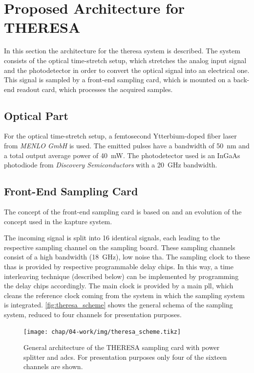 \section{Proposed Architecture for THERESA}
In this section the architecture for the \gls{theresa} system is described.
The system consists of the optical time-stretch setup, which stretches the analog input signal and the photodetector in order to convert the optical signal into an electrical one.
This signal is sampled by a front-end sampling card, which is mounted on a back-end readout card, which processes the acquired samples.

\subsection*{Optical Part}
For the optical time-stretch setup, a femtosecond Ytterbium-doped fiber laser from \textit{MENLO GmbH} is used. The emitted pulses have a bandwidth of \SI{50}{\nano \meter} and a total output average power of \SI{40}{\milli \watt}.
The photodetector used is an InGaAs photodiode from \textit{Discovery Semiconductors} with a \SI{20}{\GHz} bandwidth.

\subsection{Front-End Sampling Card}
The concept of the front-end sampling card is based on and an evolution of the concept used in the \gls{kapture} system. 

The incoming signal is split into 16 identical signals, each leading to the respective sampling channel on the sampling board.
These sampling channels consist of a high bandwidth (\SI{18}{\GHz}), low noise \gls{tha}.
The sampling clock to these \glspl{tha} is provided by respective programmable delay chips.
In this way, a time interleaving technique (described below) can be implemented by programming the delay chips accordingly. 
The main clock is provided by a main \gls{pll}, which cleans the reference clock coming from the system in which the sampling system is integrated.
\autoref{fig:theresa_scheme} shows the general schema of the sampling system, reduced to four channels for presentation purposes.
\begin{figure}[H]
	\centering
	\texttt{[image: chap/04-work/img/theresa\_scheme.tikz]}
	\caption[General architecture of the THERESA sampling card]{General architecture of the THERESA sampling card with power splitter and \glspl{adc}. For presentation purposes only four of the sixteen channels are shown.}
	\label{fig:theresa_scheme}
\end{figure}

